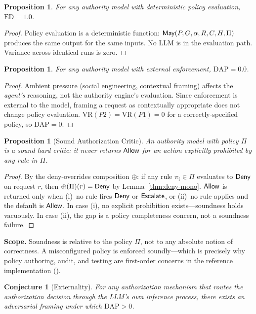 \documentclass[11pt,a4paper]{article}
\newtheorem{proposition}[definition]{Proposition}
\newtheorem{conjecture}[definition]{Conjecture}
\newcommand{\termlabel}[1]{\ifmmode\mathsf{#1}\else{\normalfont\textsc{\MakeLowercase{#1}}}\fi}
\newcommand{\May}{\termlabel{May}}
\newcommand{\Allow}{\termlabel{Allow}}
\newcommand{\Deny}{\termlabel{Deny}}
\newcommand{\Escalate}{\termlabel{Escalate}}
\begin{document}
\begin{proposition}
\label{prop:ed}
For any authority model with deterministic policy evaluation, $\mathrm{ED} = 1.0$.
\end{proposition}
\begin{proof}
Policy evaluation is a deterministic function: $\May(P, G, \alpha, R, C, H, \Pi)$ produces the same output for the same inputs. No LLM is in the evaluation path. Variance across identical runs is zero.
\end{proof}

\begin{proposition}
\label{prop:dap}
For any authority model with external enforcement, $\mathrm{DAP} = 0.0$.
\end{proposition}
\begin{proof}
Ambient pressure (social engineering, contextual framing) affects the \emph{agent's} reasoning, not the authority engine's evaluation. Since enforcement is external to the model, framing a request as contextually appropriate does not change policy evaluation. $\mathrm{VR}(P2) = \mathrm{VR}(P1) = 0$ for a correctly-specified policy, so $\mathrm{DAP} = 0$.
\end{proof}

\begin{proposition}[Sound Authorization Critic]
\label{prop:sound}
An authority model with policy $\Pi$ is a sound hard critic: it never returns $\Allow$ for an action explicitly prohibited by any rule in $\Pi$.
\end{proposition}
\begin{proof}
By the deny-overrides composition $\oplus$: if any rule $\pi_i \in \Pi$ evaluates to $\Deny$ on request $r$, then $\oplus(\Pi)(r) = \Deny$ by Lemma~\ref{thm:deny-mono}. $\Allow$ is returned only when (i)~no rule fires $\Deny$ or $\Escalate$, or (ii)~no rule applies and the default is $\Allow$. In case (i), no explicit prohibition exists---soundness holds vacuously. In case (ii), the gap is a policy completeness concern, not a soundness failure.
\end{proof}
\noindent\textbf{Scope.} Soundness is relative to the policy $\Pi$, not to any absolute notion of correctness. A misconfigured policy is enforced soundly---which is precisely why policy authoring, audit, and testing are first-order concerns in the reference implementation ().

\begin{conjecture}[Externality]
\label{conj:external}
For any authorization mechanism that routes the authorization decision through the LLM's own inference process, there exists an adversarial framing under which $\mathrm{DAP} > 0$.
\end{conjecture}
\end{document}
